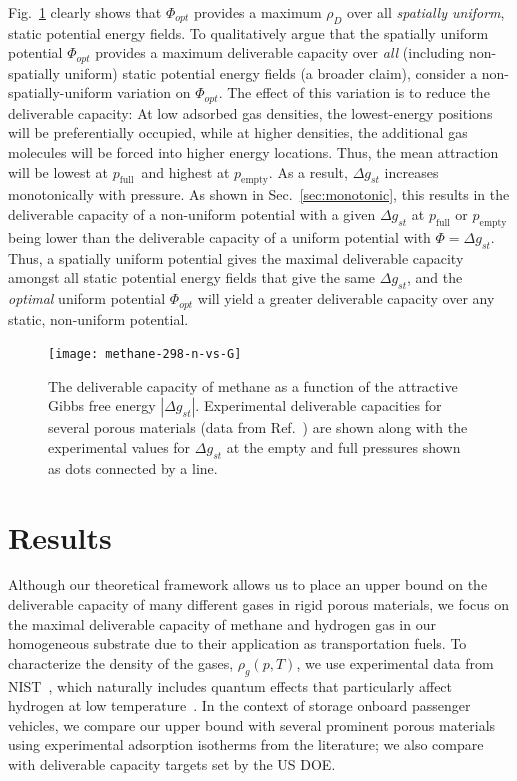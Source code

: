 \documentclass[twoside,twocolumn,9pt]{article}
\newcommand\V{\Phi}
\newcommand\pfull{\ensuremath{p_{\text{full}}}}
\newcommand\pempty{\ensuremath{p_{\text{empty}}}}
\newcommand\gst{\ensuremath{\Delta g_{st}}}
\begin{document}
Fig.~\ref{fig:methane-298-D} clearly shows that $\V_{opt}$ provides a maximum
$\rho_D$ over all \emph{spatially uniform}, static potential energy fields. To
qualitatively argue that the spatially uniform potential $\V_{opt}$ provides a
maximum deliverable capacity over \emph{all} (including non-spatially uniform)
static potential energy fields (a broader claim), consider a
non-spatially-uniform variation on $\V_{opt}$. The effect of
this variation is to reduce the deliverable capacity: At low adsorbed gas
densities, the lowest-energy positions will be preferentially occupied, while
at higher densities, the additional gas molecules will be forced into higher
energy locations. Thus, the mean attraction will be lowest at \pfull\ and
highest at \pempty. As a result, $\gst$ increases monotonically with
pressure. As shown in Sec.~\ref{sec:monotonic}, this results in
the deliverable capacity of a non-uniform potential with a given $\gst$ at $\pfull$ or $\pempty$ being lower than the
deliverable capacity of a uniform potential with $\V=\gst$. Thus, a spatially uniform potential gives the maximal
deliverable capacity amongst all static potential energy fields that give the
same $\gst$, and the \emph{optimal} uniform potential $\V_{opt}$ will yield a
greater deliverable capacity over any static, non-uniform potential.

\begin{figure}
    \centering
    \texttt{[image: methane-298-n-vs-G]}
    \caption{The deliverable capacity of methane as a function of the attractive Gibbs free energy $|\gst|$.
    Experimental deliverable capacities for several porous materials (data from Ref.~\cite{mason2014evaluating, furukawa2009storage}) are shown along with the experimental values for $\gst$ at the empty and full pressures shown as dots connected by a line.}
    \label{fig:methane-298-D}
\end{figure}

\section{Results}
Although our theoretical framework allows us to place an upper bound on the
deliverable capacity of many different gases in rigid porous materials, we
focus on the maximal deliverable capacity of methane and hydrogen gas in our
homogeneous substrate due to their application as transportation fuels. To
characterize the density of the gases, $\rho_g(p, T)$, we use experimental data
from NIST~\cite{nist}, which naturally includes quantum effects that
particularly affect hydrogen at low temperature~\cite{kumar2006quantum}. In the
context of storage onboard passenger vehicles, we compare our upper bound with
several prominent porous materials using experimental adsorption isotherms from
the literature; we also compare with deliverable capacity targets set by the US
DOE.
\end{document}
